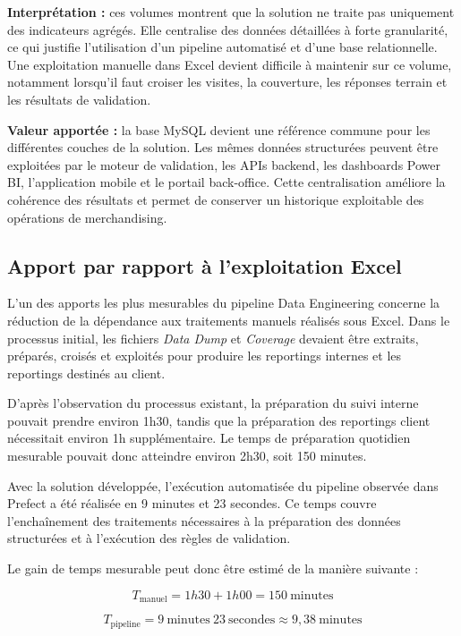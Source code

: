 \textbf{Interprétation :} ces volumes montrent que la solution ne traite pas uniquement des indicateurs agrégés. Elle centralise des données détaillées à forte granularité, ce qui justifie l’utilisation d’un pipeline automatisé et d’une base relationnelle. Une exploitation manuelle dans Excel devient difficile à maintenir sur ce volume, notamment lorsqu’il faut croiser les visites, la couverture, les réponses terrain et les résultats de validation.

\textbf{Valeur apportée :} la base MySQL devient une référence commune pour les différentes couches de la solution. Les mêmes données structurées peuvent être exploitées par le moteur de validation, les APIs backend, les dashboards Power BI, l’application mobile et le portail back-office. Cette centralisation améliore la cohérence des résultats et permet de conserver un historique exploitable des opérations de merchandising.

\subsection{Apport par rapport à l’exploitation Excel}

L’un des apports les plus mesurables du pipeline Data Engineering concerne la réduction de la dépendance aux traitements manuels réalisés sous Excel. Dans le processus initial, les fichiers \textit{Data Dump} et \textit{Coverage} devaient être extraits, préparés, croisés et exploités pour produire les reportings internes et les reportings destinés au client.

D’après l’observation du processus existant, la préparation du suivi interne pouvait prendre environ 1h30, tandis que la préparation des reportings client nécessitait environ 1h supplémentaire. Le temps de préparation quotidien mesurable pouvait donc atteindre environ 2h30, soit 150 minutes.

Avec la solution développée, l’exécution automatisée du pipeline observée dans Prefect a été réalisée en 9 minutes et 23 secondes. Ce temps couvre l’enchaînement des traitements nécessaires à la préparation des données structurées et à l’exécution des règles de validation.

Le gain de temps mesurable peut donc être estimé de la manière suivante :

\[
T_{\mathrm{manuel}} = 1h30 + 1h00 = 150 \ \mathrm{minutes}
\]

\[
T_{\mathrm{pipeline}} = 9 \ \mathrm{minutes} \ 23 \ \mathrm{secondes}
\approx 9{,}38 \ \mathrm{minutes}
\]

